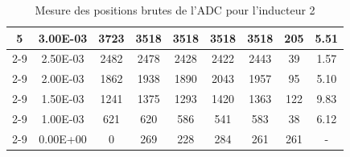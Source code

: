 \begin{table}[H]
{\begin{tabular}{|c|c|c|c|c|c|c|c|c|}
            \multirow{6}{*}{5} & 3.00E-03         & 3723      & 3518                                                       & 3518                                                      & 3518                                                      & 3518    & 205    & 5.51                                                               \\ \cline{2-9}
                               & 2.50E-03         & 2482      & 2478                                                       & 2428                                                      & 2422                                                      & 2443    & 39     & 1.57                                                               \\ \cline{2-9}
                               & 2.00E-03         & 1862      & 1938                                                       & 1890                                                      & 2043                                                      & 1957    & 95     & 5.10                                                               \\ \cline{2-9}
                               & 1.50E-03         & 1241      & 1375                                                       & 1293                                                      & 1420                                                      & 1363    & 122    & 9.83                                                               \\ \cline{2-9}
                               & 1.00E-03         & 621       & 620                                                        & 586                                                       & 541                                                       & 583     & 38     & 6.12                                                               \\ \cline{2-9}
                               & 0.00E+00         & 0         & 269                                                        & 228                                                       & 284                                                       & 261     & 261    & -                                                                  \\ \hline
        \end{tabular}%
    }
    \caption{Mesure des positions brutes de l'ADC pour l'inducteur 2}
    \label{tab:adc_brut_inducteur2}
\end{table}

